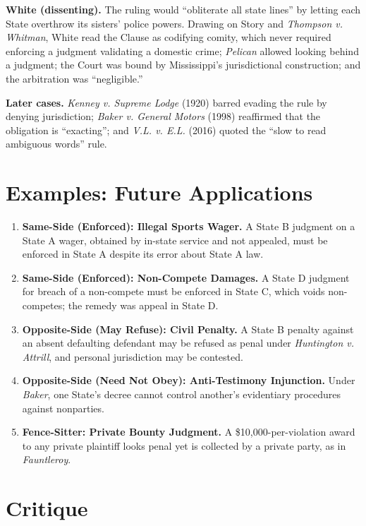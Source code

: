 \documentclass[12pt]{article}
\begin{document}
\textbf{White (dissenting).} The ruling would ``obliterate all state lines'' by letting each State overthrow its sisters' police powers. Drawing on Story and \textit{Thompson v. Whitman}, White read the Clause as codifying comity, which never required enforcing a judgment validating a domestic crime; \textit{Pelican} allowed looking behind a judgment; the Court was bound by Mississippi's jurisdictional construction; and the arbitration was ``negligible.''

\textbf{Later cases.} \textit{Kenney v. Supreme Lodge} (1920) barred evading the rule by denying jurisdiction; \textit{Baker v. General Motors} (1998) reaffirmed that the obligation is ``exacting''; and \textit{V.L. v. E.L.} (2016) quoted the ``slow to read ambiguous words'' rule.

\section{Examples: Future Applications}

\begin{enumerate}
\item \textbf{Same-Side (Enforced): Illegal Sports Wager.} A State B judgment on a State A wager, obtained by in-state service and not appealed, must be enforced in State A despite its error about State A law.
\item \textbf{Same-Side (Enforced): Non-Compete Damages.} A State D judgment for breach of a non-compete must be enforced in State C, which voids non-competes; the remedy was appeal in State D.
\item \textbf{Opposite-Side (May Refuse): Civil Penalty.} A State B penalty against an absent defaulting defendant may be refused as penal under \textit{Huntington v. Attrill}, and personal jurisdiction may be contested.
\item \textbf{Opposite-Side (Need Not Obey): Anti-Testimony Injunction.} Under \textit{Baker}, one State's decree cannot control another's evidentiary procedures against nonparties.
\item \textbf{Fence-Sitter: Private Bounty Judgment.} A \$10,000-per-violation award to any private plaintiff looks penal yet is collected by a private party, as in \textit{Fauntleroy}.
\end{enumerate}

\section{Critique}
\end{document}
